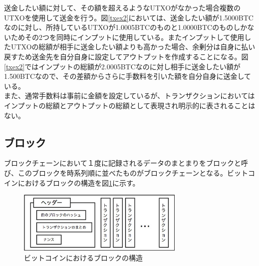 \documentclass[12pt]{jarticle}
\begin{document}
送金したい額に対して、その額を超えるようなUTXOがなかった場合複数のUTXOを使用して送金を行う。図\ref{txex2}においては、送金したい額が1.5000BTCなのに対し、所持しているUTXOが1.0005BTCのものと1.0000BTCのものしかないためその2つを同時にインプットに使用している。またインプットして使用したUTXOの総額が相手に送金したい額よりも高かった場合、余剰分は自身に払い戻すため送金先を自分自身に設定してアウトプットを作成することになる。図\ref{txex2}ではインプットの総額が2.0005BTCなのに対し相手に送金したい額が1.500BTCなので、その差額からさらに手数料を引いた額を自分自身に送金している。\\
また、通常手数料は事前に金額を設定しているが、トランザクションにおいてはインプットの総額とアウトプットの総額として表現され明示的に表されることはない。

\subsection{ブロック}
ブロックチェーンにおいて１度に記録されるデータのまとまりをブロックと呼び、このブロックを時系列順に並べたものがブロックチェーンとなる。ビットコインにおけるブロックの構造を図\ref{block}に示す。

\begin{figure}[h]
 \centering
   \includegraphics[width=80mm]{figures/blockdata.jpg}
 \caption{ビットコインにおけるブロックの構造}
 \label{block}
\end{figure}
\end{document}
